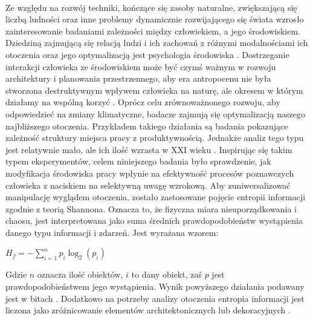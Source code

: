 \documentclass[12pt,a4paper,final,oneside,onecolumn,titlepage]{article}
\begin{document}
\paragraph{}
Ze względu na rozwój techniki, kończące się zasoby naturalne, zwiększającą się liczbą ludności oraz inne problemy dynamicznie rozwijającego się świata wzrosło zainteresowanie badaniami zależności między człowiekiem, a jego środowiskiem. Dziedziną zajmującą się relacją ludzi i ich zachowań z różnymi modalnościami ich otoczenia oraz jego optymalizacją jest psychologia środowiska \citep{banka_psychologia_2018, gifford_environmental_2011}. Dostrzeganie interakcji człowieka ze środowiskiem może być czymś ważnym w rozwoju architektury i planowania przestrzennego, aby era antropocenu nie była stworzona destruktywnym wpływem człowieka na naturę, ale okresem w którym działamy na wspólną korzyć \citep{zalasiewicz_new_2010}. Oprócz celu zrównoważnonego rozwoju, aby odpowiedzieć na zmiany klimatyczne, badacze zajmują się optymalizacją naszego najbliższego otoczenia. Przykładem takiego działania są badania \citet{lohr_interior_1996} pokazujące zależność struktury miejsca pracy z produktywnością. Jednakże analiz tego typu jest relatywnie mało, ale ich ilość wzrasta w XXI wieku \citep{spano_human_2020}. Inspirując się takim typem eksperymentów, celem niniejszego badania było sprawdzenie, jak modyfikacja środowiska pracy wpłynie na efektywność procesów poznawczych człowieka z naciskiem na selektywną uwagę wzrokową. Aby zuniwersalizować manipulację wyglądem otoczenia, zostało zastosowane pojęcie entropii informacji zgodnie z teorią Shannona. Oznacza to, że fizyczna miara nieuporządkowania i chaosu, jest interpretowana jako suma średnich prawdopodobieństw wystąpienia danego typu informacji i zdarzeń. Jest wyrażana wzorem:
\begin{center}
\begin{math}
H_f=-\displaystyle\sum_{i=1}^{n}p_i\log_2({p_i})
\end{math}
\end{center}
Gdzie $n$ oznacza ilość obiektów, $i$ to dany obiekt, zaś $p$ jest prawdopodobieństwem jego wystąpienia. Wynik powyższego działania podawany jest w bitach \citep{stamps_entropy_2004}. Dodatkowo na potrzeby analizy otoczenia entropia informacji jest liczona jako zróżnicowanie elementów architektonicznych lub dekoracyjnych \citep{stamps_entropy_2004, stamps_entropy_2002}.
\end{document}
